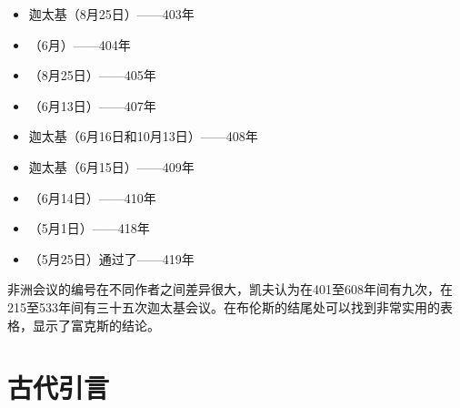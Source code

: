 \begin{itemize}
\item 迦太基（8月25日）——403年
\end{itemize}

\begin{itemize}
\item （6月）——404年
\end{itemize}

\begin{itemize}
\item （8月25日）——405年
\end{itemize}

\begin{itemize}
\item （6月13日）——407年
\end{itemize}

\begin{itemize}
\item 迦太基（6月16日和10月13日）——408年
\end{itemize}

\begin{itemize}
\item 迦太基（6月15日）——409年
\end{itemize}

\begin{itemize}
\item （6月14日）——410年
\end{itemize}

\begin{itemize}
\item （5月1日）——418年
\end{itemize}

\begin{itemize}
\item （5月25日）通过了——419年
\end{itemize}

非洲会议的编号在不同作者之间差异很大，凯夫认为在401至608年间有九次，在215至533年间有三十五次迦太基会议。在布伦斯的结尾处可以找到非常实用的表格，显示了富克斯的结论。\par


\section{古代引言}

